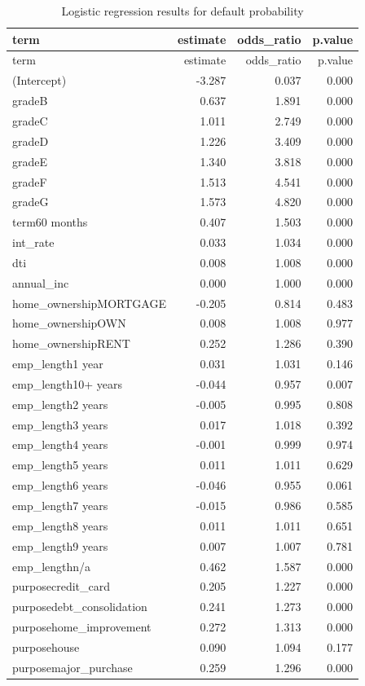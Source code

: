 \documentclass[11pt,preprint]{elsarticle}
\numberwithin{equation}{section}
\numberwithin{figure}{section}
\numberwithin{table}{section}
\begin{document}
\begin{longtable}[]{@{}lrrr@{}}
\caption{Logistic regression results for default
probability}\tabularnewline
\toprule\noalign{}
term & estimate & odds\_ratio & p.value \\
\midrule\noalign{}
\endfirsthead
\toprule\noalign{}
term & estimate & odds\_ratio & p.value \\
\midrule\noalign{}
\endhead
\bottomrule\noalign{}
\endlastfoot
(Intercept) & -3.287 & 0.037 & 0.000 \\
gradeB & 0.637 & 1.891 & 0.000 \\
gradeC & 1.011 & 2.749 & 0.000 \\
gradeD & 1.226 & 3.409 & 0.000 \\
gradeE & 1.340 & 3.818 & 0.000 \\
gradeF & 1.513 & 4.541 & 0.000 \\
gradeG & 1.573 & 4.820 & 0.000 \\
term60 months & 0.407 & 1.503 & 0.000 \\
int\_rate & 0.033 & 1.034 & 0.000 \\
dti & 0.008 & 1.008 & 0.000 \\
annual\_inc & 0.000 & 1.000 & 0.000 \\
home\_ownershipMORTGAGE & -0.205 & 0.814 & 0.483 \\
home\_ownershipOWN & 0.008 & 1.008 & 0.977 \\
home\_ownershipRENT & 0.252 & 1.286 & 0.390 \\
emp\_length1 year & 0.031 & 1.031 & 0.146 \\
emp\_length10+ years & -0.044 & 0.957 & 0.007 \\
emp\_length2 years & -0.005 & 0.995 & 0.808 \\
emp\_length3 years & 0.017 & 1.018 & 0.392 \\
emp\_length4 years & -0.001 & 0.999 & 0.974 \\
emp\_length5 years & 0.011 & 1.011 & 0.629 \\
emp\_length6 years & -0.046 & 0.955 & 0.061 \\
emp\_length7 years & -0.015 & 0.986 & 0.585 \\
emp\_length8 years & 0.011 & 1.011 & 0.651 \\
emp\_length9 years & 0.007 & 1.007 & 0.781 \\
emp\_lengthn/a & 0.462 & 1.587 & 0.000 \\
purposecredit\_card & 0.205 & 1.227 & 0.000 \\
purposedebt\_consolidation & 0.241 & 1.273 & 0.000 \\
purposehome\_improvement & 0.272 & 1.313 & 0.000 \\
purposehouse & 0.090 & 1.094 & 0.177 \\
purposemajor\_purchase & 0.259 & 1.296 & 0.000 \\
\end{longtable}
\end{document}
